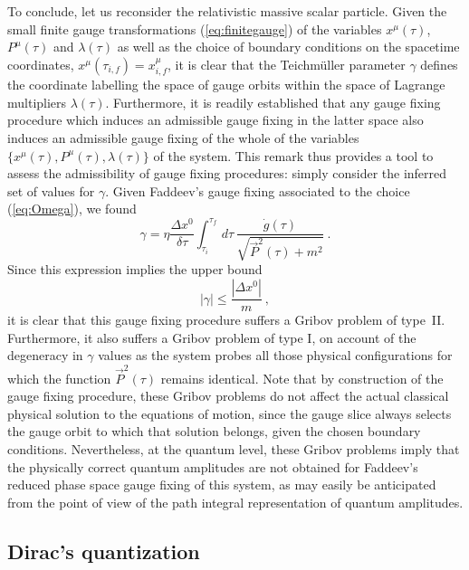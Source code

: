 \documentclass[a4paper,11pt]{article}
\begin{document}
To conclude, let us reconsider the relativistic massive scalar particle.
Given the small finite gauge transformations (\ref{eq:finitegauge}) of 
the variables $x^\mu(\tau)$, $P^\mu(\tau)$ and $\lambda(\tau)$ as well as
the choice of boundary conditions on the spacetime coordinates, 
$x^\mu(\tau_{i,f})=x^\mu_{i,f}$, it is clear that the Teichm\"uller
parameter $\gamma$ defines the coordinate labelling the space of gauge
orbits within the space of Lagrange multipliers $\lambda(\tau)$. 
Furthermore, it is readily established\cite{JG1} that any gauge fixing 
procedure which induces an admissible gauge fixing in the latter space also
induces an admissible gauge fixing of the whole of the variables
$\{x^\mu(\tau),P^\mu(\tau),\lambda(\tau)\}$ of the system. This remark
thus provides a tool to assess the admissibility of gauge fixing
procedures: simply consider the inferred set of values for $\gamma$.
Given Faddeev's gauge fixing associated to the choice (\ref{eq:Omega}),
we found
\begin{equation}
\gamma=\eta\frac{\Delta x^0}{\delta\tau}\int_{\tau_i}^{\tau_f}\,d\tau\,
\frac{\dot{g}(\tau)}{\sqrt{\vec{P}^2(\tau)+m^2}}\ .
\end{equation}
Since this expression implies the upper bound
\begin{equation}
|\gamma|\le\frac{|\Delta x^0|}{m}\ ,
\end{equation}
it is clear that this gauge fixing procedure suffers a Gribov problem
of type~II. Furthermore, it also suffers a Gribov problem of type I,
on account of the degeneracy in $\gamma$ values as the system probes
all those physical configurations for which the function $\vec{P}^2(\tau)$ 
remains identical.\cite{JG1,JG5} Note that by construction of the gauge 
fixing procedure,
these Gribov problems do not affect the actual classical physical solution
to the equations of motion, since the gauge slice always selects the gauge
orbit to which that solution belongs, given the chosen boundary conditions.
Nevertheless, at the quantum level, these Gribov pro\-blems imply that the
physically correct quantum amplitudes are not obtained for Faddeev's
reduced phase space gauge fixing of this system,\cite{JG1,JG5} as may 
ea\-si\-ly be anticipated from the point of view of the path integral 
representation of quantum amplitudes.

\subsection{Dirac's quantization}
\label{Subsect5.4}
\end{document}
